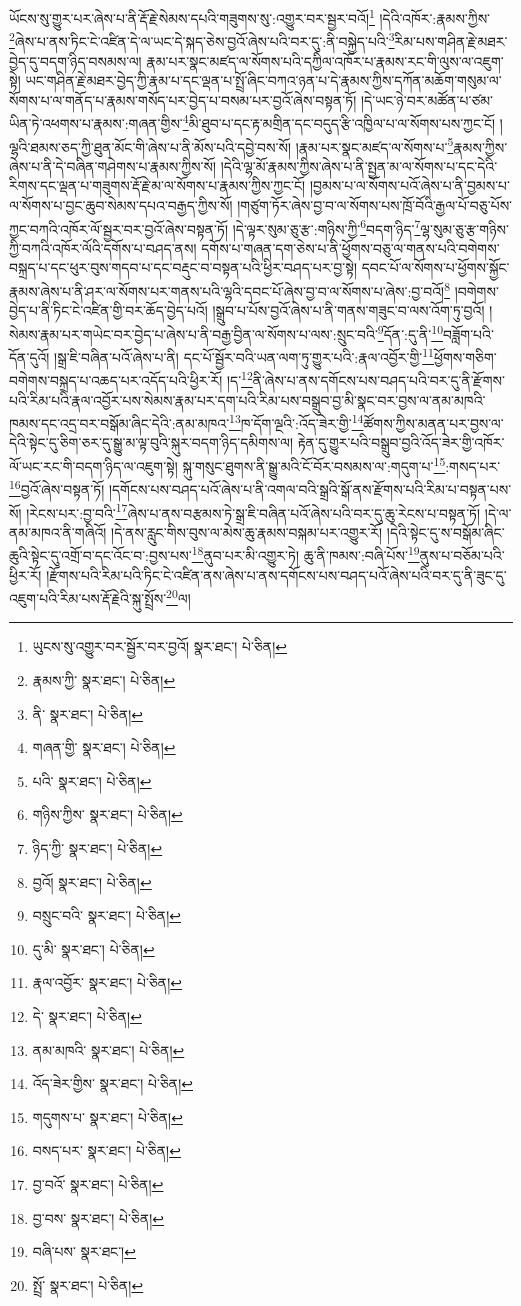 ཡོངས་སུ་གྱུར་པར་ཞེས་པ་ནི་རྡོ་རྗེ་སེམས་དཔའི་གཟུགས་སུ་:འགྱུར་བར་སྦྱར་བའོ།\footnote{ཡུངས་སུ་འགྱུར་བར་སྦྱོར་བར་བྱའོ།  སྣར་ཐང་།  པེ་ཅིན། } །དེའི་འཁོར་:རྣམས་ཀྱིས་\footnote{རྣམས་ཀྱི་  སྣར་ཐང་།  པེ་ཅིན། }ཞེས་པ་ནས་ཏིང་ངེ་འཛིན་དེ་ལ་ཡང་དེ་སྐད་ཅེས་བྱའོ་ཞེས་པའི་བར་དུ་:ནི་བསྐྱེད་པའི་\footnote{ནི་  སྣར་ཐང་།  པེ་ཅིན། }རིམ་པས་གཤིན་རྗེ་མཐར་བྱེད་དུ་བདག་ཉིད་བསམས་ལ། རྣམ་པར་སྣང་མཛད་ལ་སོགས་པའི་དཀྱིལ་འཁོར་པ་རྣམས་རང་གི་ལུས་ལ་འཇུག་སྟེ། ཡང་གཤིན་རྗེ་མཐར་བྱེད་ཀྱི་རྣམ་པ་དང་ལྡན་པ་སྤྲོ་ཞིང་བཀའ་ཉན་པ་དེ་རྣམས་ཀྱིས་དཀོན་མཆོག་གསུམ་ལ་སོགས་པ་ལ་གནོད་པ་རྣམས་གསོད་པར་བྱེད་པ་བསམ་པར་བྱའོ་ཞེས་བསྟན་ཏོ། །དེ་ཡང་ཉེ་བར་མཚོན་པ་ཙམ་ཡིན་ཏེ་འཕགས་པ་རྣམས་:གཞན་གྱིས་\footnote{གཞན་གྱི་  སྣར་ཐང་།  པེ་ཅིན། }མི་ཐུབ་པ་དང་རྟ་མགྲིན་དང་བདུད་རྩི་འཁྱིལ་པ་ལ་སོགས་པས་ཀྱང་ངོ། །ལྷའི་ཐམས་ཅད་ཀྱི་ཐུན་མོང་གི་ཞེས་པ་ནི་མོས་པའི་དབྱེ་བས་སོ། །རྣམ་པར་སྣང་མཛད་ལ་སོགས་པ་\footnote{པའི་  སྣར་ཐང་།  པེ་ཅིན། }རྣམས་ཀྱིས་ཞེས་པ་ནི་དེ་བཞིན་གཤེགས་པ་རྣམས་ཀྱིས་སོ། །དེའི་ལྷ་མོ་རྣམས་ཀྱིས་ཞེས་པ་ནི་སྤྱན་མ་ལ་སོགས་པ་དང་དེའི་རིགས་དང་ལྡན་པ་གཟུགས་རྡོ་རྗེ་མ་ལ་སོགས་པ་རྣམས་ཀྱིས་ཀྱང་ངོ། །བྱམས་པ་ལ་སོགས་པའོ་ཞེས་པ་ནི་བྱམས་པ་ལ་སོགས་པ་བྱང་ཆུབ་སེམས་དཔའ་བརྒྱད་ཀྱིས་སོ། །གཙུག་ཏོར་ཞེས་བྱ་བ་ལ་སོགས་པས་ཁྲོ་བོའི་རྒྱལ་པོ་བཅུ་པོས་ཀྱང་བཀའི་འཁོར་ལོ་སྦྱར་བར་བྱའོ་ཞེས་བསྟན་ཏོ། །དེ་ལྟར་སུམ་ཅུ་རྩ་:གཉིས་ཀྱི་\footnote{གཉིས་ཀྱིས་  སྣར་ཐང་།  པེ་ཅིན། }བདག་ཉིད་\footnote{ཉིད་ཀྱི་  སྣར་ཐང་།  པེ་ཅིན། }ལྷ་སུམ་ཅུ་རྩ་གཉིས་ཀྱི་བཀའི་འཁོར་ལོའི་དགོས་པ་བཤད་ནས། དགོས་པ་གཞན་དག་ཅེས་པ་ནི་ཕྱོགས་བཅུ་ལ་གནས་པའི་བགེགས་བསྐྲད་པ་དང་ཕུར་བུས་གདབ་པ་དང་བརྡུང་བ་བསྟན་པའི་ཕྱིར་བཤད་པར་བྱ་སྟེ། དབང་པོ་ལ་སོགས་པ་ཕྱོགས་སྐྱོང་རྣམས་ཞེས་པ་ནི་ཤར་ལ་སོགས་པར་གནས་པའི་ལྷའི་དབང་པོ་ཞེས་བྱ་བ་ལ་སོགས་པ་ཞེས་:བྱ་བའོ།\footnote{བྱའོ།  སྣར་ཐང་།  པེ་ཅིན། } །བགེགས་བྱེད་པ་ནི་ཏིང་ངེ་འཛིན་གྱི་བར་ཆོད་བྱེད་པའོ། །སྒྲུབ་པ་པོས་བྱའོ་ཞེས་པ་ནི་གནས་གཟུང་བ་ལས་འོག་ཏུ་བྱའོ། །སེམས་རྣམ་པར་གཡེང་བར་བྱེད་པ་ཞེས་པ་ནི་བརྒྱ་བྱིན་ལ་སོགས་པ་ལས་:སྲུང་བའི་\footnote{བསྲུང་བའི་  སྣར་ཐང་།  པེ་ཅིན། }དོན་:དུ་ནི་\footnote{དུ་མི་  སྣར་ཐང་།  པེ་ཅིན། }བཟློག་པའི་དོན་དུའོ། །སྒྲ་ཇི་བཞིན་པའོ་ཞེས་པ་ནི། དང་པོ་སྦྱོར་བའི་ཡན་ལག་ཏུ་གྱུར་པའི་:རྣལ་འབྱོར་གྱི་\footnote{རྣལ་འབྱོར་  སྣར་ཐང་།  པེ་ཅིན། }ཕྱོགས་གཅིག་བགེགས་བསྐྲད་པ་འཆད་པར་འདོད་པའི་ཕྱིར་རོ། །ད་\footnote{དེ་  སྣར་ཐང་།  པེ་ཅིན། }ནི་ཞེས་པ་ནས་དགོངས་པས་བཤད་པའི་བར་དུ་ནི་རྫོགས་པའི་རིམ་པའི་རྣལ་འབྱོར་པས་སེམས་རྣམ་པར་དག་པའི་རིམ་པས་བསྒྲུབ་བྱ་མི་སྣང་བར་བྱས་ལ་ནམ་མཁའི་ཁམས་དང་འདྲ་བར་བསྒོམ་ཞིང་དེའི་:ནམ་མཁའ་\footnote{ནམ་མཁའི་  སྣར་ཐང་།  པེ་ཅིན། }ཁ་དོག་ལྔའི་:འོད་ཟེར་གྱི་\footnote{འོད་ཟེར་གྱིས་  སྣར་ཐང་།  པེ་ཅིན། }ཚོགས་ཀྱིས་མནན་པར་བྱས་ལ་དེའི་སྟེང་དུ་ཅིག་ཅར་དུ་སྒྱུ་མ་ལྟ་བུའི་སྐུར་བདག་ཉིད་དམིགས་ལ། རྟེན་དུ་གྱུར་པའི་བསྒྲུབ་བྱའི་འོད་ཟེར་གྱི་འཁོར་ལོ་ཡང་རང་གི་བདག་ཉིད་ལ་འཇུག་སྟེ། སྐུ་གསུང་ཐུགས་ནི་སྒྱུ་མའི་ངོ་བོར་བསམས་ལ་:གདུག་པ་\footnote{གདུགས་པ་  སྣར་ཐང་།  པེ་ཅིན། }:གསད་པར་\footnote{བསད་པར་  སྣར་ཐང་།  པེ་ཅིན། }བྱའོ་ཞེས་བསྟན་ཏོ། །དགོངས་པས་བཤད་པའོ་ཞེས་པ་ནི་འགལ་བའི་སྒྲའི་སྒོ་ནས་རྫོགས་པའི་རིམ་པ་བསྟན་པས་སོ། །རེངས་པར་:བྱ་བའི་\footnote{བྱ་བའོ་  སྣར་ཐང་།  པེ་ཅིན། }ཞེས་པ་ནས་བརྩམས་ཏེ་སྒྲ་ཇི་བཞིན་པའོ་ཞེས་པའི་བར་དུ་ཆུ་རེངས་པ་བསྟན་ཏོ། །དེ་ལ་ནམ་མཁའ་ནི་གཞིའོ། །དེ་ནས་རླུང་གིས་བུས་ལ་མེས་ཆུ་རྣམས་བསྐམ་པར་འགྱུར་རོ། །དེའི་སྟེང་དུ་ས་བསྒོམ་ཞིང་ཆུའི་སྟེང་དུ་འགྲོ་བ་དང་འོང་བ་:བྱས་པས་\footnote{བྱ་བས་  སྣར་ཐང་།  པེ་ཅིན། }ནུབ་པར་མི་འགྱུར་ཏེ། ཆུ་ནི་ཁམས་:བཞི་པོས་\footnote{བཞི་པས་  སྣར་ཐང་། }ནུས་པ་བཅོམ་པའི་ཕྱིར་རོ། །རྫོགས་པའི་རིམ་པའི་ཏིང་ངེ་འཛིན་ནས་ཞེས་པ་ནས་དགོངས་པས་བཤད་པའོ་ཞེས་པའི་བར་དུ་ནི་ཟུང་དུ་འཇུག་པའི་རིམ་པས་རྡོ་རྗེའི་སྐུ་སྤྲོས་\footnote{སྤྲོ་  སྣར་ཐང་།  པེ་ཅིན། }ལ། 